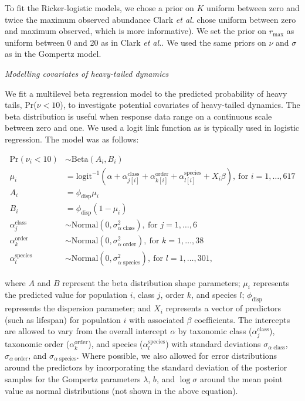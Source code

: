 To fit the Ricker-logistic models, we chose a prior on \(K\) uniform between zero and twice the maximum observed abundance Clark \emph{et al.}\cite{clark2010} chose uniform between zero and maximum observed, which is more informative). We set the prior on \(r_\mathrm{max}\) as uniform between 0 and 20 as in Clark \emph{et al.}\cite{clark2010}. We used the same priors on \(\nu\) and \(\sigma\) as in the Gompertz model.

\emph{Modelling covariates of heavy-tailed dynamics}

We fit a multilevel beta regression model to the predicted probability of heavy tails, Pr(\(\nu < 10\)), to investigate potential covariates of heavy-tailed dynamics. The beta distribution is useful when response data range on a continuous scale between zero and one\cite{ferrari2004}. We used a logit link function as is typically used in logistic regression. The model was as follows:

\begin{align*}
\mathrm{Pr}(\nu_i < 10) &\sim \mathrm{Beta}(A_i, B_i)\\
\mu_i &= \mathrm{logit}^{-1}(\alpha
  + \alpha^\mathrm{class}_{j[i]}
  + \alpha^\mathrm{order}_{k[i]}
  + \alpha^\mathrm{species}_{l[i]}
  + X_i \beta),
  \: \text{for } i = 1, \dots, 617\\
A_i &= \phi_\mathrm{disp} \mu_i\\
B_i &= \phi_\mathrm{disp} (1 - \mu_i)\\
\alpha^\mathrm{class}_j &\sim
  \mathrm{Normal}(0, \sigma^2_{\alpha \; \mathrm{class}}),
  \: \text{for } j = 1, \dots, 6\\
\alpha^\mathrm{order}_k &\sim
  \mathrm{Normal}(0, \sigma^2_{\alpha \; \mathrm{order}}),
  \: \text{for } k = 1, \dots, 38\\
\alpha^\mathrm{species}_l &\sim
  \mathrm{Normal}(0, \sigma^2_{\alpha \; \mathrm{species}}),
  \: \text{for } l = 1, \dots, 301,
\end{align*}

where \(A\) and \(B\) represent the beta distribution shape parameters; \(\mu_i\) represents the predicted value for population \(i\), class \(j\), order \(k\), and species \(l\); \(\phi_\mathrm{disp}\) represents the dispersion parameter; and \(X_i\) represents a vector of predictors (such as lifespan) for population \(i\) with associated \(\beta\) coefficients. The intercepts are allowed to vary from the overall intercept \(\alpha\) by taxonomic class (\(\alpha^\mathrm{class}_j\)), taxonomic order (\(\alpha^\mathrm{order}_k\)), and species (\(\alpha^\mathrm{species}_l\)) with standard deviations \(\sigma_{\alpha \;  \mathrm{class}}\), \(\sigma_{\alpha \; \mathrm{order}}\), and \(\sigma_{\alpha  \; \mathrm{species}}\). Where possible, we also allowed for error distributions around the predictors by incorporating the standard deviation of the posterior samples for the Gompertz parameters \(\lambda\), \(b\), and \(\log \sigma\) around the mean point value as normal distributions (not shown in the above equation).


